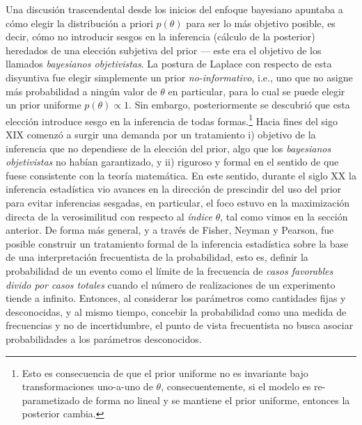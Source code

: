 Una discusión trascendental desde los inicios del enfoque bayesiano apuntaba a  cómo elegir la distribución a  priori $p(\theta)$ para ser lo más objetivo posible, es decir, cómo no introducir sesgos en la inferencia (cálculo de la posterior) heredados de una elección subjetiva del prior --- este era el objetivo de los llamados \emph{bayesianos objetivistas}. La postura de Laplace con respecto de esta disyuntiva fue elegir simplemente un prior \emph{no-informativo}, i.e., uno que no asigne más probabilidad a ningún valor de $\theta$ en particular, para lo cual se puede elegir un prior uniforme $p(\theta)\propto 1$. Sin embargo, posteriormente se descubrió que esta elección introduce sesgo en la inferencia de todas formas.\footnote{Esto es consecuencia de que el prior uniforme no es invariante bajo transformaciones uno-a-uno de $\theta$, consecuentemente, si el modelo es re-parametizado de forma no lineal y se mantiene el prior uniforme, entonces la posterior cambia.} Hacia fines del sigo XIX comenzó a surgir una demanda por un tratamiento i) objetivo de la inferencia que no dependiese de la elección del prior, algo que los \emph{bayesianos objetivistas} no habían garantizado, y ii) riguroso y formal en el sentido de que fuese consistente con la teoría matemática. En este sentido, durante el siglo XX la inferencia estadística vio avances en la dirección de prescindir del uso del prior para evitar inferencias sesgadas, en particular, el foco estuvo en la maximización directa de la verosimilitud con respecto al \emph{índice} $\theta$, tal como vimos en la sección anterior. De forma más general, y a través de Fisher, Neyman y Pearson, fue posible construir un tratamiento formal de la inferencia estadística sobre la base de una interpretación frecuentista de la probabilidad, esto es, definir la probabilidad de un evento como el límite de la frecuencia de \emph{casos favorables divido por casos totales} cuando el número de realizaciones de un experimento tiende a infinito. Entonces, al considerar los parámetros como cantidades fijas y desconocidas, y al mismo tiempo, concebir la probabilidad como una medida de frecuencias y no de incertidumbre, el punto de vista frecuentista no busca asociar probabilidades a los parámetros desconocidos.\\

